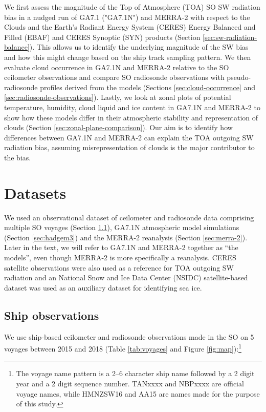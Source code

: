We first assess the magnitude of the Top of Atmosphere (TOA) SO SW radiation
bias in a nudged run of GA7.1 ("GA7.1N") and MERRA-2 with respect to the Clouds
and the Earth's Radiant Energy System (CERES) Energy Balanced and Filled (EBAF)
and CERES Synoptic (SYN) products (Section \ref{sec:sw-radiation-balance}). This
allows us to identify the underlying magnitude of the SW bias and how this might
change based on the ship track sampling pattern. We then evaluate cloud
occurrence in GA7.1N and MERRA-2 relative to the SO ceilometer observations and
compare SO radiosonde observations with pseudo-radiosonde profiles derived from
the models (Sections \ref{sec:cloud-occurrence} and
\ref{sec:radiosonde-observations}). Lastly, we look at zonal plots of potential
temperature, humidity, cloud liquid and ice content in GA7.1N and MERRA-2 to
show how these models differ in their atmospheric stability and representation
of clouds (Section \ref{sec:zonal-plane-comparison}). Our aim is to identify how
differences between GA7.1N and MERRA-2 can explain the TOA outgoing SW
radiation bias, assuming misrepresentation of clouds is the major contributor
to the bias.

\section{Datasets}
\label{sec:datasets}

We used an observational dataset of ceilometer and radiosonde data comprising
multiple SO voyages (Section \ref{sec:ship-observations}), GA7.1N atmospheric
model simulations (Section \ref{sec:hadgem3}) and the MERRA-2 reanalysis
(Section \ref{sec:merra-2}). Later in the text, we will refer to GA7.1N and
MERRA-2 together as ``the models'', even though MERRA-2 is more specifically a
reanalysis. CERES satellite observations \citep{wielicki1996} were also used as
a reference for TOA outgoing SW radiation and an National Snow and Ice Data
Center (NSIDC) satellite-based dataset \citep{maslanik1999} was used as an
auxiliary dataset for identifying sea ice.

\subsection{Ship observations}
\label{sec:ship-observations}

We use ship-based ceilometer and radiosonde observations made in the SO on 5
voyages between 2015 and 2018 (Table \ref{tab:voyages} and Figure
\ref{fig:map}):\footnote{The voyage name pattern is a 2--6 character ship name
followed by a 2 digit year and a 2 digit sequence number. TANxxxx and NBPxxxx
are official voyage names, while HMNZSW16 and AA15 are names made for the
purpose of this study.}

